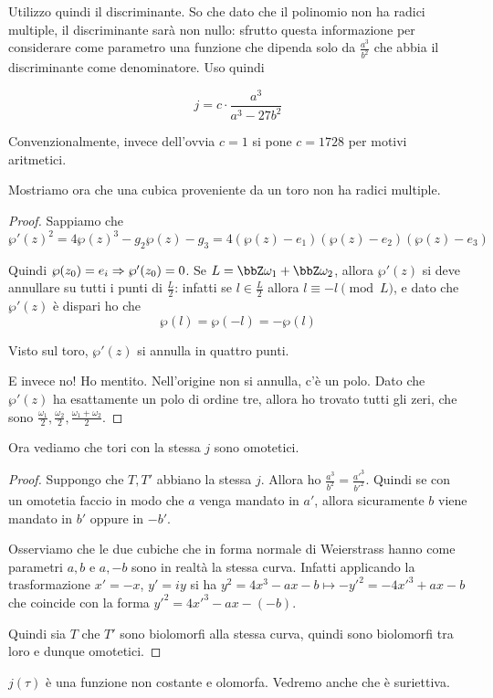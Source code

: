 	Utilizzo quindi il discriminante. So che dato che il polinomio non ha radici multiple, il discriminante sarà non nullo: sfrutto questa informazione per considerare come parametro una funzione che dipenda solo da $\frac{a^3}{b^2}$ che abbia il discriminante come denominatore. Uso quindi

	\[
		j = c \cdot \frac {a^3}{a^3-27b^2}
	\]

	Convenzionalmente, invece dell'ovvia $c=1$ si pone $c=1728$ per motivi aritmetici.

	Mostriamo ora che una cubica proveniente da un toro non ha radici multiple.

	\begin{proof}
		Sappiamo che
		\[
			\wp'(z)^2=4\wp(z)^3-g_2\wp(z)-g_3 = 4(\wp(z)-e_1)(\wp(z)-e_2)(\wp(z)-e_3)
		\]

		Quindi $\wp(z_0)=e_i \Rightarrow\wp'(z_0)=0$.
		Se $L=\bbZ\omega_1 + \bbZ\omega_2$, allora $\wp'(z)$ si deve annullare su tutti i punti di $\frac L2$: infatti se $l \in \frac L2$ allora $l \equiv -l \pmod L$, e dato che $\wp'(z)$ è dispari ho che
		\[
			\wp(l) = \wp(-l) = -\wp(l)
		\]

		Visto sul toro, $\wp'(z)$ si annulla in quattro punti.

		E invece no! Ho mentito. Nell'origine non si annulla, c'è un polo. Dato che $\wp'(z)$ ha esattamente un polo di ordine tre, allora ho trovato tutti gli zeri, che sono $\frac{\omega_1}2, \frac{\omega_2}2, \frac{\omega_1+\omega_2}2$.


	\end{proof}

	Ora vediamo che tori con la stessa $j$ sono omotetici.

	\begin{proof}
          Suppongo che $T, T'$ abbiano la stessa $j$. Allora ho $\frac{a^3}{b^2}=\frac{a'^3}{b'^2}$. Quindi se con un omotetia faccio in modo che $a$ venga mandato in $a'$, allora sicuramente $b$ viene mandato in $b'$ oppure in $-b'$.

          Osserviamo che le due cubiche che in forma normale di Weierstrass hanno come parametri $a, b$ e $a, -b$ sono in realtà la stessa curva. Infatti applicando la trasformazione $x' = -x$, $y' = iy$ si ha $y^2 = 4x^3 - ax - b \mapsto - y'^2 = - 4x'^3 + ax - b$ che coincide con la forma $y'^2 = 4x'^3 - ax - (-b)$.

          Quindi sia $T$ che $T'$ sono biolomorfi alla stessa curva, quindi sono biolomorfi tra loro e dunque omotetici.
	\end{proof}

	\begin{osservazione}
		$j(\tau)$ è una funzione non costante e olomorfa. Vedremo anche che è suriettiva.
	\end{osservazione}
